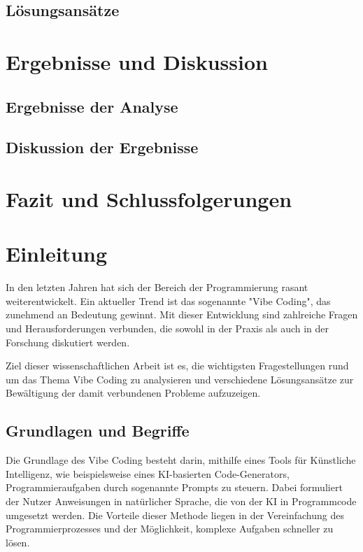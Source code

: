 \documentclass[paper=a4,fontsize=12pt,ngerman]{scrartcl}
\begin{document}
\subsection{Lösungsansätze}

\section{Ergebnisse und Diskussion}
\subsection{Ergebnisse der Analyse}
\subsection{Diskussion der Ergebnisse}

\section{Fazit und Schlussfolgerungen}

\clearpage
{}

\section{Einleitung}
 In den letzten Jahren hat sich der Bereich der Programmierung rasant weiterentwickelt.
 Ein aktueller Trend ist das sogenannte "Vibe Coding", das zunehmend an Bedeutung gewinnt.
 Mit dieser Entwicklung sind zahlreiche Fragen und Herausforderungen verbunden, 
 die sowohl in der Praxis als auch in der Forschung diskutiert werden.

 Ziel dieser wissenschaftlichen Arbeit ist es, die wichtigsten Fragestellungen
 rund um das Thema Vibe Coding zu analysieren und verschiedene 
 Lösungsansätze zur Bewältigung der damit verbundenen Probleme aufzuzeigen.

\subsection{Grundlagen und Begriffe}
 Die Grundlage des Vibe Coding besteht darin,
 mithilfe eines Tools für Künstliche Intelligenz, 
 wie beispielsweise eines KI-basierten Code-Generators, 
 Programmieraufgaben durch sogenannte Prompts zu steuern. 
 Dabei formuliert der Nutzer Anweisungen in natürlicher Sprache, 
 die von der KI in Programmcode umgesetzt werden.
 Die Vorteile dieser Methode liegen in der Vereinfachung des Programmierprozesses
 und der Möglichkeit, komplexe Aufgaben schneller zu lösen.
\end{document}
